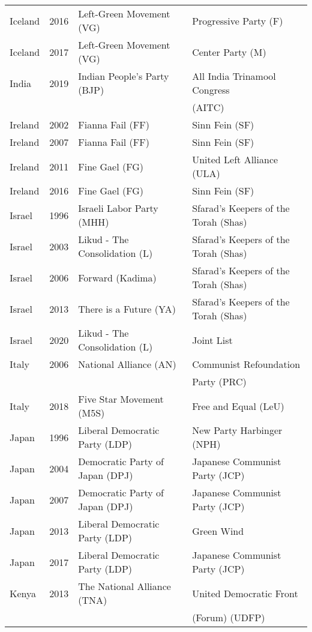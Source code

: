 {\begin{longtable}{|l|c|l|l|}
  Iceland & 2016 &   Left-Green Movement (VG) &   Progressive Party (F) \\ 
  Iceland & 2017 &   Left-Green Movement (VG) &   Center Party (M) \\ 
  India & 2019 &  Indian People's Party (BJP)   &  All India Trinamool Congress   \\ 
          & &      &    (AITC) \\ 
  Ireland & 2002 &   Fianna Fail (FF) &   Sinn Fein (SF) \\ 
  Ireland & 2007 &   Fianna Fail (FF) &   Sinn Fein (SF) \\ 
  Ireland & 2011 &   Fine Gael (FG) &   United Left Alliance (ULA) \\ 
  Ireland & 2016 &   Fine Gael (FG) &   Sinn Fein (SF) \\ 
  Israel & 1996 &   Israeli Labor Party (MHH) &   Sfarad's Keepers of the    Torah (Shas)\\ 
  Israel & 2003 &   Likud - The Consolidation (L) &   Sfarad's Keepers of the Torah (Shas)  \\ 
  Israel & 2006 &   Forward (Kadima) &   Sfarad's Keepers of the  Torah (Shas)  \\ 
  Israel & 2013 &   There is a Future (YA) &   Sfarad's Keepers of the  Torah (Shas) \\ 
  Israel & 2020 &   Likud - The Consolidation (L) &   Joint List   \\ 
  Italy & 2006 &   National Alliance (AN)   &   Communist Refoundation   \\ 
         &   &      &    Party (PRC) \\ 
  Italy & 2018 &   Five Star Movement (M5S) &   Free and Equal (LeU) \\ 
  Japan & 1996 &   Liberal Democratic Party (LDP) &   New Party Harbinger (NPH) \\ 
  Japan & 2004 &   Democratic Party of Japan (DPJ)   &   Japanese Communist Party (JCP) \\ 
  Japan & 2007 &   Democratic Party of Japan (DPJ)   &   Japanese Communist Party (JCP) \\ 
  Japan & 2013 &   Liberal Democratic Party (LDP) &   Green Wind \\ 
  Japan & 2017 &   Liberal Democratic Party (LDP) &   Japanese Communist Party (JCP) \\ 
  Kenya & 2013 &   The National Alliance (TNA) &   United Democratic Front   \\ 
         &      &    &    (Forum) (UDFP) \\ 

\end{longtable}}

